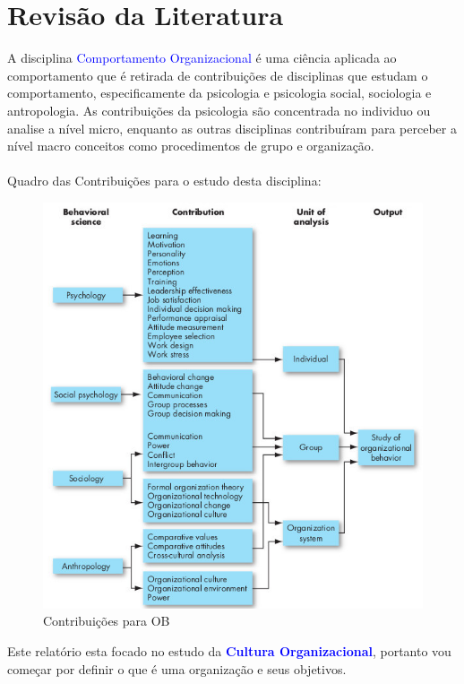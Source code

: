 {%
\newpage
\section{Revisão da Literatura}
\qquad A disciplina \textcolor{blue}{Comportamento Organizacional} é uma ciência aplicada ao comportamento que é retirada de contribuições de disciplinas que estudam o comportamento, especificamente da psicologia e psicologia social, sociologia e antropologia.
As contribuições da psicologia são concentrada no individuo ou analise a nível micro, enquanto as outras disciplinas contribuíram para perceber a nível macro conceitos como procedimentos de grupo e organização.\\
\\
Quadro das Contribuições para o estudo desta disciplina:
\begin{figure}[H]
\centering
\includegraphics[scale=0.52]{./image/OB/OB_contributions.jpg}
\caption{Contribuições para OB}
\end{figure}
Este relatório esta focado no estudo da \textcolor{blue}{\textbf{Cultura Organizacional}}, portanto vou começar por definir o que é uma organização e seus objetivos.\\

}
